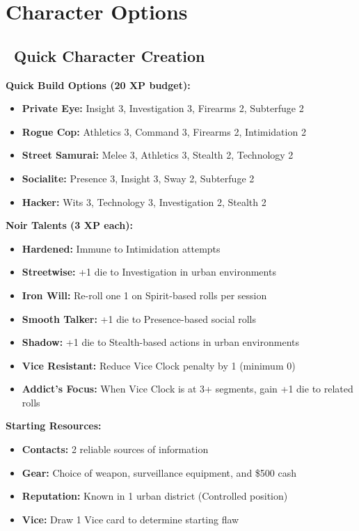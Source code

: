 \documentclass[11pt]{article}
\begin{document}
\newpage

\section{Character Options}

\subsection*{\faUser\ Quick Character Creation}

\textbf{Quick Build Options (20 XP budget):}
\begin{itemize}
    \item \textbf{Private Eye:} Insight 3, Investigation 3, Firearms 2, Subterfuge 2
    \item \textbf{Rogue Cop:} Athletics 3, Command 3, Firearms 2, Intimidation 2
    \item \textbf{Street Samurai:} Melee 3, Athletics 3, Stealth 2, Technology 2
    \item \textbf{Socialite:} Presence 3, Insight 3, Sway 2, Subterfuge 2
    \item \textbf{Hacker:} Wits 3, Technology 3, Investigation 2, Stealth 2
\end{itemize}

\textbf{Noir Talents (3 XP each):}
\begin{itemize}
    \item \textbf{Hardened:} Immune to Intimidation attempts
    \item \textbf{Streetwise:} +1 die to Investigation in urban environments
    \item \textbf{Iron Will:} Re-roll one 1 on Spirit-based rolls per session
    \item \textbf{Smooth Talker:} +1 die to Presence-based social rolls
    \item \textbf{Shadow:} +1 die to Stealth-based actions in urban environments
    \item \textbf{Vice Resistant:} Reduce Vice Clock penalty by 1 (minimum 0)
    \item \textbf{Addict's Focus:} When Vice Clock is at 3+ segments, gain +1 die to related rolls
\end{itemize}

\textbf{Starting Resources:}
\begin{itemize}
    \item \textbf{Contacts:} 2 reliable sources of information
    \item \textbf{Gear:} Choice of weapon, surveillance equipment, and \$500 cash
    \item \textbf{Reputation:} Known in 1 urban district (Controlled position)
    \item \textbf{Vice:} Draw 1 Vice card to determine starting flaw
\end{itemize}
\end{document}
